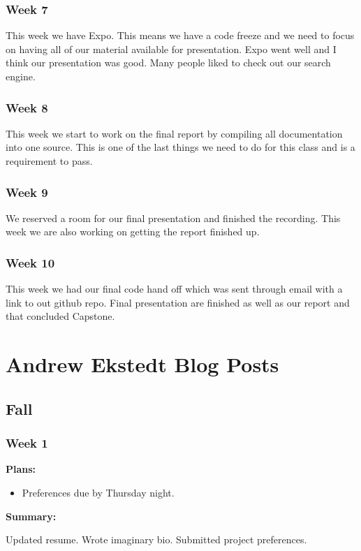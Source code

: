 \subsubsection{Week 7}
This week we have Expo. This means we have a code freeze and we need to focus on having all of our material available for presentation. Expo went well and I think our presentation was good. Many people liked to check out our search engine.
\subsubsection{Week 8}
This week we start to work on the final report by compiling all documentation into one source. This is one of the last things we need to do for this class and is a requirement to pass.
\subsubsection{Week 9}
We reserved a room for our final presentation and finished the recording. This week we are also working on getting the report finished up.
\subsubsection{Week 10}
This week we had our final code hand off which was sent through email with a link to out github repo. Final presentation are finished as well as our report and that concluded Capstone.

\section{Andrew Ekstedt Blog Posts}

\subsection{Fall}

\subsubsection{Week 1}

\noindent \textbf{Plans:}
\begin{itemize}
\item Preferences due by Thursday night.
\end{itemize}

\noindent \textbf{Summary:}

Updated resume. Wrote imaginary bio.
Submitted project preferences.

